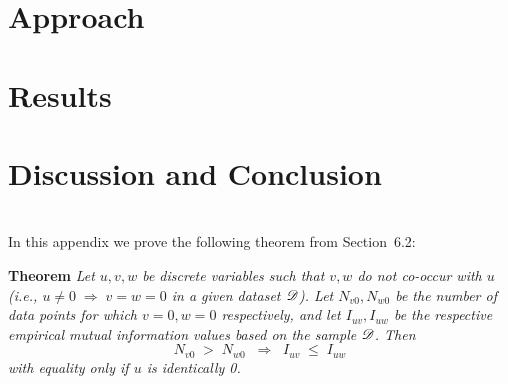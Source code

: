 \documentclass[twoside,11pt]{article}
\newcommand{\dataset}{{\cal D}}
\begin{document}
\section{Approach}

\section{Results}

\section{Discussion and Conclusion}






\newpage

\appendix
\section{}
\label{app:theorem}



In this appendix we prove the following theorem from
Section~6.2:

\noindent
{\bf Theorem} {\it Let $u,v,w$ be discrete variables such that $v, w$ do
not co-occur with $u$ (i.e., $u\neq0\;\Rightarrow \;v=w=0$ in a given
dataset $\dataset$). Let $N_{v0},N_{w0}$ be the number of data points for
which $v=0, w=0$ respectively, and let $I_{uv},I_{uw}$ be the
respective empirical mutual information values based on the sample
$\dataset$. Then
\[
	N_{v0} \;>\; N_{w0}\;\;\Rightarrow\;\;I_{uv} \;\leq\;I_{uw}
\]
with equality only if $u$ is identically 0.} \hfill\BlackBox
\end{document}
